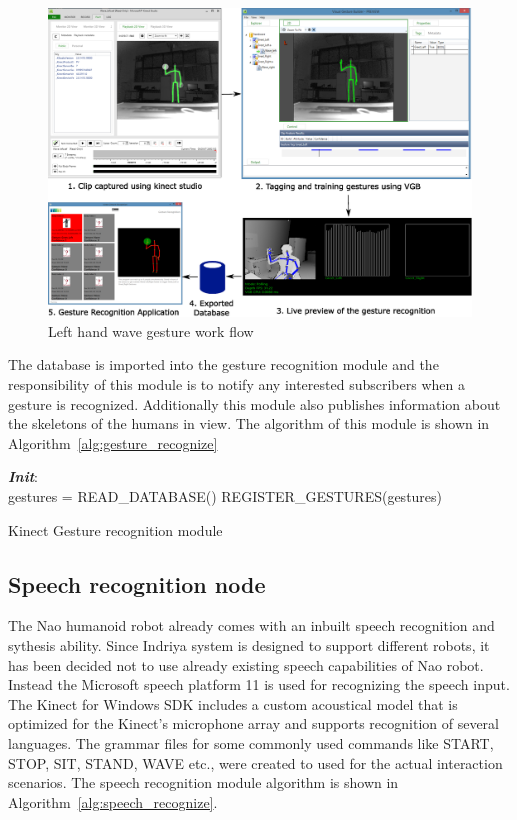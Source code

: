 \begin{figure}[H]
\centering
\includegraphics[width=\textwidth]{assets/gesture_recog_flow.eps}
\caption[Left hand wave gesture work flow]{Left hand wave gesture work flow}
\label{fig:gesture_waveleft}
\end{figure}
The database is imported into the gesture recognition module and the responsibility of this module is to notify any interested subscribers when a gesture is recognized. Additionally this module also publishes information about the skeletons of the humans in view. The algorithm of this module is shown in Algorithm~\ref{alg:gesture_recognize}

\begin{algorithm}[H]
 \textbf{\emph{Init}}:\\
 \quad gestures = READ\_DATABASE()\;
 \quad REGISTER\_GESTURES(gestures)\;
 \caption{Kinect Gesture recognition module}
 \label{alg:gesture_recognize}
\end{algorithm}
\subsection{Speech recognition node}
The Nao humanoid robot already comes with an inbuilt speech recognition and sythesis ability. Since Indriya system is designed to support different robots, it has been decided not to use already existing speech capabilities of Nao robot. Instead the Microsoft speech platform 11 is used for recognizing the speech input. The Kinect for Windows SDK includes a custom acoustical model that is optimized for the Kinect's microphone array and supports recognition of several languages. The grammar files for some commonly used commands like START, STOP, SIT, STAND, WAVE etc., were created to used for the actual interaction scenarios. The speech recognition module algorithm is shown in Algorithm~\ref{alg:speech_recognize}.

